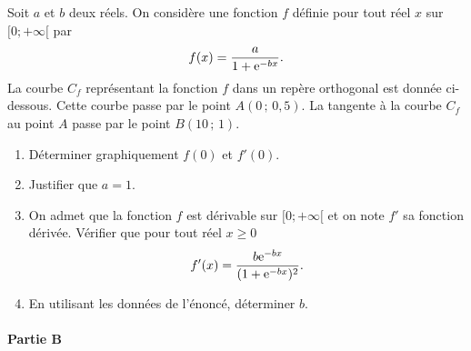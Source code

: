 \documentclass[11pt,fleqn, openany]{book} %
\begin{document}
\begin{exercise}[topic=lim24, subtitle={(Antilles - Guyane 2019)}]
Soit $a$ et $b$ deux réels. On considère une fonction $f$ définie pour tout réel $x$ sur $[0;+\infty[$ par
\[f(x)=\dfrac{a}{1+\mathrm{e}^{-bx}}.\]
La courbe $C_f$ représentant la fonction $f$ dans un repère orthogonal est donnée ci-dessous. Cette courbe passe par le point $A(0\, ;\, 0,5)$.
La tangente à la courbe $C_f$ au point $A$ passe par le point $B(10\,;\,1)$.
\vskip10pt
\begin{center}
\end{center}
\vskip10pt
\begin{enumerate}
\item Déterminer graphiquement $f(0)$ et $f'(0)$.
\item Justifier que $a=1$.
\item On admet que la fonction $f$ est dérivable sur $[0;+\infty[$ et on note $f'$ sa fonction dérivée. Vérifier que pour tout réel $x\geqslant 0$
\[f'(x)=\dfrac{b\mathrm{e}^{-bx}}{(1+\mathrm{e}^{-bx})^2}.\]
\item En utilisant les données de l'énoncé, déterminer $b$.
\end{enumerate}

\paragraph{Partie B}	


\end{exercise}
\end{document}
